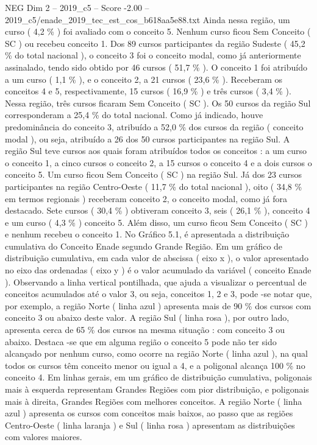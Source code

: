 \begin{textsample}{NEG Dim 2 – 2019\_c5 – Score -2.00 – 2019\_c5/enade\_2019\_tec\_est\_cos\_b618aa5e88.txt}
Ainda nessa região, um curso ( 4,2 \% ) foi avaliado com o conceito 5.
Nenhum curso ficou Sem Conceito ( SC ) ou recebeu conceito 1.
Dos 89 cursos participantes da região Sudeste ( 45,2 \% do total nacional ), o conceito 3 foi o conceito modal, como já anteriormente assinalado, tendo sido obtido por 46 cursos ( 51,7 \% ).
O conceito 1 foi atribuído a um curso ( 1,1 \% ), e o conceito 2, a 21 cursos ( 23,6 \% ).
Receberam os conceitos 4 e 5, respectivamente, 15 cursos ( 16,9 \% ) e três cursos ( 3,4 \% ).
Nessa região, três cursos ficaram Sem Conceito ( SC ).
Os 50 cursos da região Sul corresponderam a 25,4 \% do total nacional.
Como já indicado, houve predominância do conceito 3, atribuído a 52,0 \% dos cursos da região ( conceito modal ), ou seja, atribuído a 26 dos 50 cursos participantes na região Sul.
A região Sul teve cursos aos quais foram atribuídos todos os conceitos : a um curso o conceito 1, a cinco cursos o conceito 2, a 15 cursos o conceito 4 e a dois cursos o conceito 5.
Um curso ficou Sem Conceito ( SC ) na região Sul.
Já dos 23 cursos participantes na região Centro-Oeste ( 11,7 \% do total nacional ), oito ( 34,8 \% em termos regionais ) receberam conceito 2, o conceito modal, como já fora destacado.
Sete cursos ( 30,4 \% ) obtiveram conceito 3, seis ( 26,1 \% ), conceito 4 e um curso ( 4,3 \% ) conceito 5.
Além disso, um curso ficou Sem Conceito ( SC ) e nenhum recebeu o conceito 1.
No Gráfico 5.1, é apresentada a distribuição cumulativa do Conceito Enade segundo Grande Região.
Em um gráfico de distribuição cumulativa, em cada valor de abscissa ( eixo x ), o valor apresentado no eixo das ordenadas ( eixo y ) é o valor acumulado da variável ( conceito Enade ).
Observando a linha vertical pontilhada, que ajuda a visualizar o percentual de conceitos acumulados até o valor 3, ou seja, conceitos 1, 2 e 3, pode -se notar que, por exemplo, a região Norte ( linha azul ) apresenta mais de 90 \% dos cursos com conceito 3 ou abaixo deste valor.
A região Sul ( linha rosa ), por outro lado, apresenta cerca de 65 \% dos cursos na mesma situação : com conceito 3 ou abaixo.
Destaca -se que em alguma região o conceito 5 pode não ter sido alcançado por nenhum curso, como ocorre na região Norte ( linha azul ), na qual todos os cursos têm conceito menor ou igual a 4, e a poligonal alcança 100 \% no conceito 4.
Em linhas gerais, em um gráfico de distribuição cumulativa, poligonais mais à esquerda representam Grandes Regiões com pior distribuição, e poligonais mais à direita, Grandes Regiões com melhores conceitos.
A região Norte ( linha azul ) apresenta os cursos com conceitos mais baixos, ao passo que as regiões Centro-Oeste ( linha laranja ) e Sul ( linha rosa ) apresentam as distribuições com valores maiores.

\end{textsample}
